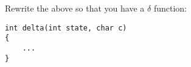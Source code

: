 Rewrite the above so that you have a $\delta$ function:
\begin{Verbatim}[frame=single, fontsize=\small]
int delta(int state, char c)
{
    ...
}
\end{Verbatim}
